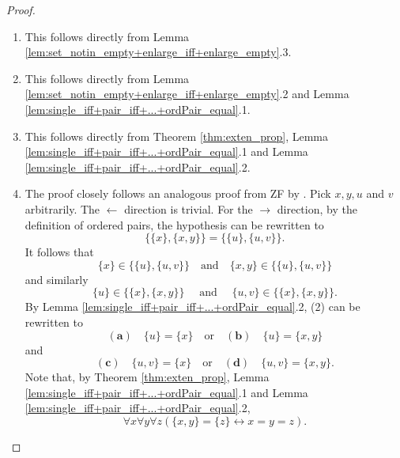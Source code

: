 \begin{proof}
    \leanok
    \leavevmode
    \begin{enumerate}
        \item This follows directly from Lemma \ref{lem:set_notin_empty+enlarge_iff+enlarge_empty}.3.
        \item This follows directly from Lemma \ref{lem:set_notin_empty+enlarge_iff+enlarge_empty}.2 and Lemma \ref{lem:single_iff+pair_iff+...+ordPair_equal}.1.
        \item This follows directly from Theorem \ref{thm:exten_prop}, Lemma \ref{lem:single_iff+pair_iff+...+ordPair_equal}.1 and Lemma \ref{lem:single_iff+pair_iff+...+ordPair_equal}.2.
        \item  The proof closely follows an analogous proof from ZF by \cite{enderton1977elements}.
        Pick $x,y,u$ and $v$ arbitrarily. The $\leftarrow$ direction is trivial.
        For the $\rightarrow$ direction, by the definition of ordered pairs, the hypothesis can be rewritten to
        \begin{equation*}
            \{\{x\}, \{x,y\}\} = \{\{u\}, \{u,v\}\}.
        \end{equation*}
        It follows that
        \begin{equation}
            \{x\} \in \{\{u\}, \{u,v\}\}\quad\text{and}\quad \{x,y\} \in \{\{u\}, \{u,v\}\}
        \end{equation}
        and similarly
        \begin{equation}
            \{u\} \in \{\{x\}, \{x,y\}\}\quad\text{ and }\quad \{u,v\} \in \{\{x\}, \{x,y\}\}.
        \end{equation}
        By Lemma \ref{lem:single_iff+pair_iff+...+ordPair_equal}.2, (2) can be rewritten to
        \begin{equation*}
            (\textbf{a})\quad\{u\}=\{x\}\quad\text{or}\quad (\textbf{b})\quad\{u\}=\{x,y\}
        \end{equation*}
        and
        \begin{equation*}
            (\textbf{c})\quad\{u,v\}=\{x\}\quad\text{or}\quad (\textbf{d})\quad\{u,v\}=\{x,y\}.
        \end{equation*}
        Note that, by Theorem \ref{thm:exten_prop}, Lemma \ref{lem:single_iff+pair_iff+...+ordPair_equal}.1 and Lemma \ref{lem:single_iff+pair_iff+...+ordPair_equal}.2,
        \begin{equation}
        \forall x \forall y \forall z (\{x,y\} = \{z\} \leftrightarrow x = y =z).
        \end{equation}

\end{enumerate}
\end{proof}
